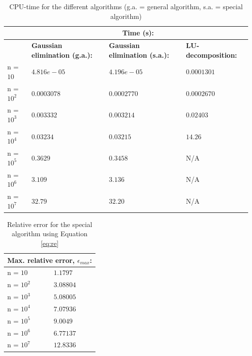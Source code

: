 \documentclass{article}
\begin{document}
\begin{table}[]
\begin{tabular}{llll}
           & \multicolumn{3}{c}{\textbf{Time (s):}}                                                                  \\ \hline
           & \textbf{Gaussian elimination (g.a.):} & \textbf{Gaussian elimination (s.a.):} & \textbf{LU-decomposition:} \\ \hline
n = $10$   & $4.816e-05$                              & $4.196e-05$                              & $0.0001301$       \\
n = $10^2$  & $0.0003078$                              & $0.0002770$                              & $0.0002670$       \\
n = $10^3$ & $0.003332$                               & $0.003214$                               & $0.02403$         \\
n = $10^4$ & $0.03234$                                & $0.03215$                                & $14.26$           \\
n = $10^5$ & $0.3629$                                 & $0.3458$                                 & N/A               \\
n = $10^6$ & $3.109$                                  & $3.136$                                  & N/A               \\
n = $10^7$ & $32.79$                                  & $32.20$                                  & N/A              
\end{tabular}
\label{tab:1}
\caption{CPU-time for the different algorithms (g.a. = general algorithm, s.a. = special algorithm)}
\end{table}

\begin{table}[]
\centering
\begin{tabular}{ll}
\multicolumn{2}{c}{\textbf{Max. relative error, $\epsilon_{max}$:}} \\ \hline
n = $10$                                  & $1.1797$                                \\
n = $10^2$                                & $3.08804$                               \\
n = $10^3$                                & $5.08005$                               \\
n = $10^4$                                & $7.07936$                               \\
n = $10^5$                                & $9.0049$                                \\
n = $10^6$                                & $6.77137$                               \\
n = $10^7$                                & $12.8336$                              
\end{tabular}
\label{tab:2}
\caption{Relative error for the special algorithm using Equation \ref{eq:re}}
\end{table}
\end{document}
